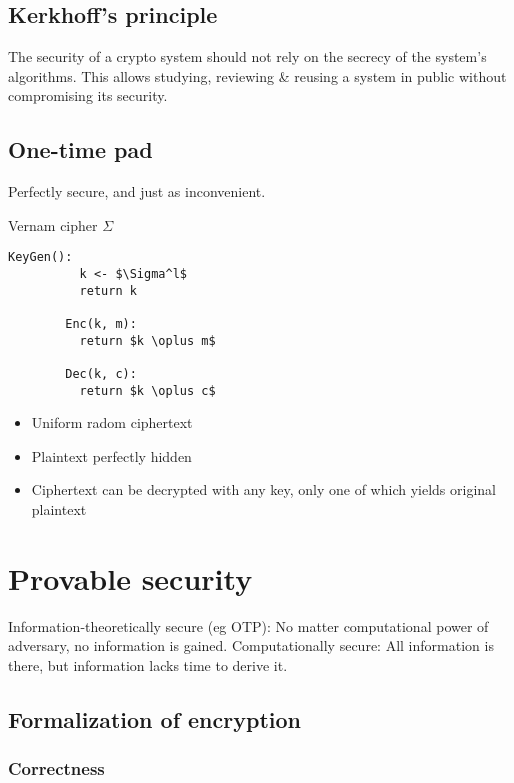 \documentclass[a4paper]{scrreprt}
\begin{document}
\section{Kerkhoff's principle}

The security of a crypto system should not rely on the secrecy of the system's
algorithms. This allows studying, reviewing \& reusing a system in public
without compromising its security.

\section{One-time pad}

Perfectly secure, and just as inconvenient.

\begin{library}{Vernam cipher $\Sigma$}
	\begin{lstlisting}[mathescape=true,autogobble=true]
		KeyGen():
		  k <- $\Sigma^l$
		  return k

		Enc(k, m):
		  return $k \oplus m$

		Dec(k, c):
		  return $k \oplus c$
	\end{lstlisting}
\end{library}

\begin{itemize}
	\item Uniform radom ciphertext
	\item Plaintext perfectly hidden
	\item Ciphertext can be decrypted with any key, only one of which
		yields original plaintext
\end{itemize}

\chapter{Provable security}

Information-theoretically secure (eg OTP): No matter computational power of
adversary, no information is gained. Computationally secure: All information is
there, but information lacks time to derive it.

\section{Formalization of encryption}

\subsection{Correctness}
\end{document}
